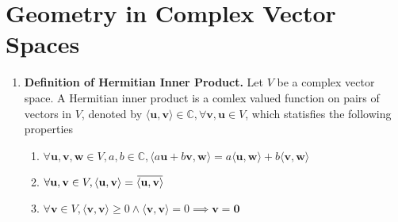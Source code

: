 \documentclass[oneside, 12pt]{book}
\newcommand{\settag}[1]{\renewcommand{\theenumi}{#1}}
\newcommand{\complex}{\mathbb{C}}
\newcommand{\tbf}[1]{\textbf{#1}}
\newcommand{\overbar}[1]{\mkern 1.5mu\overline{\mkern-1.5mu#1\mkern-1.5mu}\mkern 1.5mu}
\newcommand{\para}[1]{\item \tbf{#1}}
\newcommand{\vv}{\mathbf{v}}
\newcommand{\vu}{\mathbf{u}}
\newcommand{\vw}{\mathbf{w}}
\newcommand{\vzero}{\mathbf{0}}
\begin{document}
\section{Geometry in Complex Vector Spaces}
\begin{enumerate}
    \settag{5.3.1}
    \para{Definition of Hermitian Inner Product.} Let $V$ be a complex vector space. A Hermitian
    inner product is a comlex valued function on pairs of vectors in $V$, denoted by $\langle \vu, \vv\rangle\in \complex, \forall \vv,\vu \in V$,
    which statisfies the following properties
    \begin{enumerate}
        \item $\forall \vu, \vv, \vw\in V, a, b\in \complex, \langle a\vu+b\vv,\vw\rangle = a\langle \vu,\vw\rangle + b\langle \vv,\vw\rangle$
        \item $\forall \vu, \vv\in V, \langle \vu, \vv \rangle = \overbar{\langle \vu, \vv \rangle}$
        \item $\forall \vv\in V,\langle \vv,\vv \rangle \geq 0 \land \langle \vv,\vv\rangle =0 \implies \vv = \vzero$
    \end{enumerate}

    \settag{5.3.2}
\end{enumerate}
\end{document}
